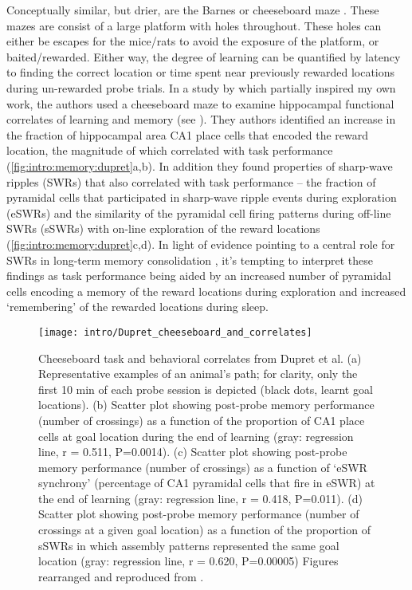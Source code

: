 Conceptually similar, but drier, are the Barnes or cheeseboard maze \citep{Barnes1979}\citep{Kesner1991}\citep{Dupret2010a}.
These mazes are consist of a large platform with holes throughout.
These holes can either be escapes for the mice/rats to avoid the exposure of the platform, or baited/rewarded.
Either way, the degree of learning can be quantified by latency to finding the correct location or time spent near previously rewarded locations during un-rewarded probe trials.
In a study by \citeauthor{Dupret2010a} which partially inspired my own work, the authors used a cheeseboard maze to examine hippocampal functional correlates of learning and memory (see ).
They authors identified an increase in the fraction of hippocampal area CA1 place cells that encoded the reward location, the magnitude of which correlated with task performance (\autoref{fig:intro:memory:dupret}a,b).
In addition they found properties of sharp-wave ripples (SWRs) that also correlated with task performance -- the fraction of pyramidal cells that participated in sharp-wave ripple events during exploration (eSWRs) and the similarity of the pyramidal cell firing patterns during off-line SWRs (sSWRs) with on-line exploration of the reward locations (\autoref{fig:intro:memory:dupret}c,d).
In light of evidence pointing to a central role for SWRs in long-term memory consolidation \citep{Buzsaki2015}, it's tempting to interpret these findings as task performance being aided by an increased number of pyramidal cells encoding a memory of the reward locations during exploration and increased `remembering' of the rewarded locations during sleep.

\begin{figure}
	\centering
	\texttt{[image: intro/Dupret\_cheeseboard\_and\_correlates]}
	\caption[Cheeseboard task and behavioral correlates from Dupret et al.]{Cheeseboard task and behavioral correlates from Dupret et al.
	(a) Representative examples of an animal's path; for clarity, only the first 10 min of each probe session is depicted (black dots, learnt goal locations).
	(b) Scatter plot showing post-probe memory performance (number of crossings) as a function of the proportion of CA1 place cells at goal location during the end of learning (gray: regression line, r = 0.511, P=0.0014).
	(c) Scatter plot showing post-probe memory performance (number of crossings) as a function of `eSWR synchrony' (percentage of CA1 pyramidal cells that fire in eSWR) at the end of learning (gray: regression line, r = 0.418, P=0.011).
	(d) Scatter plot showing post-probe memory performance (number of crossings at a given goal location) as a function of the proportion of sSWRs in which assembly patterns represented the same goal location (gray: regression line, r = 0.620, P=0.00005)
	Figures rearranged and reproduced from \citet{Dupret2010a}.}
	\label{fig:intro:memory:dupret}
\end{figure}


